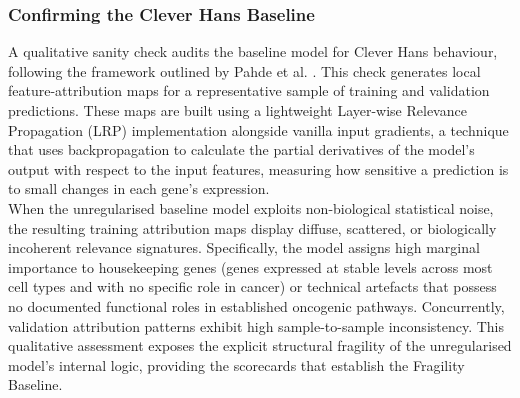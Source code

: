 \subsubsection{Confirming the Clever Hans Baseline}
\label{ssub:method_cleverhans}
A qualitative sanity check audits the baseline model for Clever Hans behaviour, 
following the framework outlined by Pahde et al. \cite{Pahde2023}. This check 
generates local feature-attribution maps for a representative sample of training and 
validation predictions. These maps are built using a lightweight Layer-wise Relevance 
Propagation (LRP) implementation alongside vanilla input gradients, a technique that 
uses backpropagation to calculate the partial derivatives of the model's output with 
respect to the input features, measuring how sensitive a prediction is to small changes 
in each gene's expression.
\\
When the unregularised baseline model exploits non-biological statistical noise, the 
resulting training attribution maps display diffuse, scattered, or biologically 
incoherent relevance signatures. Specifically, the model assigns high marginal 
importance to housekeeping genes (genes expressed at stable levels across most cell types and with no
specific role in cancer) or technical artefacts that possess no documented functional roles in
established oncogenic pathways. Concurrently, validation 
attribution patterns exhibit high sample-to-sample inconsistency. This qualitative 
assessment exposes the explicit structural fragility of the unregularised model's 
internal logic, providing the scorecards that establish the Fragility Baseline.